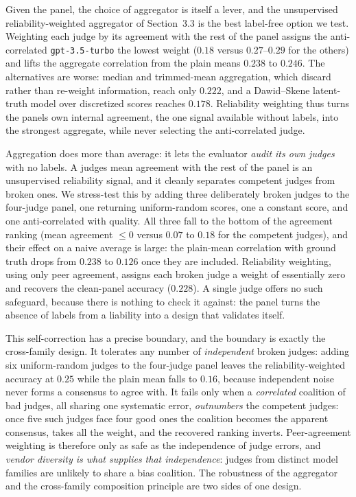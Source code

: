 Given the panel, the choice of aggregator is itself a lever, and the unsupervised reliability-weighted aggregator of
Section~3.3 is the best label-free option we test. Weighting each judge by its agreement with the rest of the
panel assigns the anti-correlated \texttt{gpt-3.5-turbo} the lowest weight (\(0.18\) versus \(0.27\)--\(0.29\) for
the others) and lifts the aggregate correlation from the plain mean\textquotesingle s \(0.238\) to \textbf{\(0.246\)}. The
alternatives are worse: median and trimmed-mean aggregation, which discard rather than re-weight information, reach
only \(0.222\), and a Dawid--Skene latent-truth model \citep{ref33} over discretized scores reaches
\(0.178\). Reliability weighting
thus turns the panel\textquotesingle s own internal agreement, the one signal available without labels, into the strongest aggregate,
while never selecting the anti-correlated judge.

Aggregation does more than average: it lets the evaluator \emph{audit its own judges} with no labels. A judge\textquotesingle s mean
agreement with the rest of the panel is an unsupervised reliability signal, and it cleanly separates competent judges
from broken ones. We stress-test this by adding three deliberately broken judges to the four-judge panel, one returning
uniform-random scores, one a constant score, and one anti-correlated with quality. All three fall to the bottom of the
agreement ranking (mean agreement \(\le 0\) versus \(0.07\) to \(0.18\) for the competent judges), and their effect on a naive
average is large: the plain-mean correlation with ground truth drops from \(0.238\) to \(0.126\) once they are included.
Reliability weighting, using only peer agreement, assigns each broken judge a weight of essentially zero and recovers
the clean-panel accuracy (\(0.228\)). A single judge offers no such safeguard, because there is nothing to check it
against: the panel turns the absence of labels from a liability into a design that validates itself.

This self-correction has a precise boundary, and the boundary is exactly the cross-family design. It tolerates any
number of \emph{independent} broken judges: adding six uniform-random judges to the four-judge panel leaves the
reliability-weighted accuracy at \(0.25\) while the plain mean falls to \(0.16\), because independent noise never forms a
consensus to agree with. It fails only when a \emph{correlated} coalition of bad judges, all sharing one
systematic error, \emph{outnumbers} the competent judges: once five such judges face four good ones the coalition
becomes the apparent consensus, takes all the weight, and the recovered ranking inverts. Peer-agreement weighting is
therefore only as safe as the independence of judge errors, and \emph{vendor diversity is what supplies that
independence}: judges from distinct model families are unlikely to share a bias coalition. The robustness of the
aggregator and the cross-family composition principle are two sides of one design.

